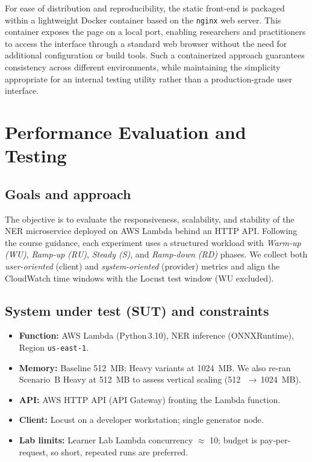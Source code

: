 \documentclass[11pt,a4paper]{article}
\begin{document}
For ease of distribution and reproducibility, the static front-end is packaged within a lightweight Docker container based on the \texttt{nginx} web server. This container exposes the page on a local port, enabling researchers and practitioners to access the interface through a standard web browser without the need for additional configuration or build tools. Such a containerized approach guarantees consistency across different environments, while maintaining the simplicity appropriate for an internal testing utility rather than a production-grade user interface.

\section{Performance Evaluation and Testing}\label{sec:testing}

\subsection{Goals and approach}
The objective is to evaluate the responsiveness, scalability, and stability of the NER microservice deployed on AWS Lambda behind an HTTP API. Following the course guidance, each experiment uses a structured workload with \emph{Warm-up (WU)}, \emph{Ramp-up (RU)}, \emph{Steady (S)}, and \emph{Ramp-down (RD)} phases. We collect both \emph{user-oriented} (client) and \emph{system-oriented} (provider) metrics and align the CloudWatch time windows with the Locust test window (WU excluded).

\subsection{System under test (SUT) and constraints}
\begin{itemize}
  \item \textbf{Function:} AWS Lambda (Python\,3.10), NER inference (ONNXRuntime), Region \texttt{us-east-1}.
  \item \textbf{Memory:} Baseline \SI{512}{MB}; Heavy variants at \SI{1024}{MB}. We also re-ran Scenario~B Heavy at \SI{512}{MB} to assess vertical scaling (\SI{512}\,$\rightarrow$\,\SI{1024}{MB}).
  \item \textbf{API:} AWS HTTP API (API Gateway) fronting the Lambda function.
  \item \textbf{Client:} Locust on a developer workstation; single generator node.
  \item \textbf{Lab limits:} Learner Lab Lambda concurrency $\approx$ 10; budget is pay-per-request, so short, repeated runs are preferred.
\end{itemize}
\end{document}
